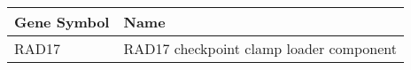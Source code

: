 \begin{tabular}{ll}
\toprule
Gene Symbol &                                    Name \\
\midrule
      RAD17 & RAD17 checkpoint clamp loader component \\
\bottomrule
\end{tabular}
